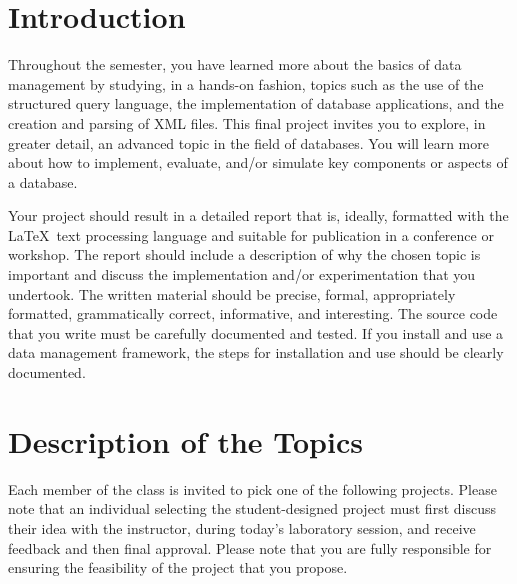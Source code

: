 


\usepackage[compact]{titlesec}



\section*{Introduction}

Throughout the semester, you have learned more about the basics of data management by studying, in a hands-on fashion,
topics such as the use of the structured query language, the implementation of database applications, and the creation
and parsing of XML files.  This final project invites you to explore, in greater detail, an advanced topic in the field
of databases. You will learn more about how to implement, evaluate, and/or simulate key components or aspects of a
database. 

Your project should result in a detailed report that is, ideally, formatted with the \LaTeX\ text processing language
and suitable for publication in a conference or workshop.  The report should include a description of why the chosen
topic is important and discuss the implementation and/or experimentation that you undertook.  The written material
should be precise, formal, appropriately formatted, grammatically correct, informative, and interesting.  The source
code that you write must be carefully documented and tested.  If you install and use a data management framework, the
steps for installation and use should be clearly documented. 

\section*{Description of the Topics}

Each member of the class is invited to pick one of the following projects.  Please note that an individual selecting the
student-designed project must first discuss their idea with the instructor, during today's laboratory session, and
receive feedback and then final approval.  Please note that you are fully responsible for ensuring the feasibility of
the project that you propose.

